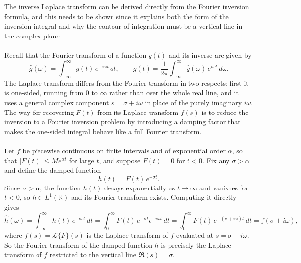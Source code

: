 The inverse Laplace transform can be derived directly from the Fourier inversion
formula, and this needs to be shown since it explains both the
form of the inversion integral and why the contour of integration must be a
vertical line in the complex plane. \cite{YellowBook, TransformsTheory}
\\
\\
Recall that the Fourier transform of a function $g(t)$ and its inverse are given by
\begin{equation}
    \hat{g}(\omega) = \int_{-\infty}^{\infty} g(t)\, e^{-i\omega t}\, dt,
    \qquad
    g(t) = \frac{1}{2\pi} \int_{-\infty}^{\infty}
    \hat{g}(\omega)\, e^{i\omega t}\, d\omega.
\end{equation}
The Laplace transform differs from the Fourier transform in two respects: first it is one-sided, running from $0$ to $\infty$ rather than over the whole real line, and it uses a general complex component $s = \sigma + i\omega$ in place of the purely imaginary $i\omega$. The way for recovering $F(t)$ from its Laplace transform $f(s)$ is to reduce the inversion to a Fourier inversion problem by introducing a damping factor that makes the one-sided integral behave like a full Fourier transform. \cite{YellowBook}
\\
\\
Let $f$ be piecewise continuous on finite intervals and of exponential order
$\alpha$, so that $|F(t)| \leq Me^{\alpha t}$ for large $t$, and suppose
$F(t) = 0$ for $t < 0$. Fix any $\sigma > \alpha$ and define the damped function
\begin{equation}
    h(t) = F(t)\, e^{-\sigma t}.
\end{equation}
Since $\sigma > \alpha$, the function $h(t)$ decays exponentially as
$t \to \infty$ and vanishes for $t < 0$, so $h \in L^{1}(\mathbb{R})$ and
its Fourier transform exists. Computing it directly gives
\begin{equation}
    \hat{h}(\omega)
    = \int_{-\infty}^{\infty} h(t)\, e^{-i\omega t}\, dt
    = \int_{0}^{\infty} F(t)\, e^{-\sigma t} e^{-i\omega t}\, dt
    = \int_{0}^{\infty} F(t)\, e^{-(\sigma + i\omega)t}\, dt
    = f(\sigma + i\omega),
\end{equation}
where $f(s) = \mathcal{L}\{F\}(s)$ is the Laplace transform of $f$ evaluated
at $s = \sigma + i\omega$. So the Fourier transform of the damped function $h$
is precisely the Laplace transform of $f$ restricted to the vertical line
$\mathfrak{R}(s) = \sigma$.
\\
\\
